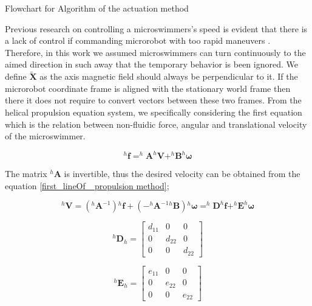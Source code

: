 \documentclass[12pt,a4paper,titlepage]{report}
\begin{document}
Flowchart for Algorithm of the actuation method


Previous research on controlling a microswimmers\rq{}s speed is evident that there is a lack
of control if commanding microrobot with too rapid maneuvers \citep{zhang2009characterizing} \citep{zhang2009artificial}
. Therefore, in this work we assumed
microswimmers can turn continuously to the aimed direction in such away that the temporary behavior is been
ignored. We define $\tilde{\bm{X}}$ as the axis magnetic field should always be perpendicular to it.
If the microrobot coordinate frame is aligned with the stationary world frame then there it does not require
to convert vectors between these two frames. From the helical propulsion equation system, 
we specifically considering the first equation which is the relation between non-fluidic force, angular and 
translational velocity of the microswimmer. 



\begin{equation}
^{h}\bm{f} = ^{h}\bm{A} ^{h}\bm{V} + ^{h}\bm{B} ^{h}\bm{\omega}
\label{first_lineOf_ propulsion method}
\end{equation}

The matrix $^{h}\bm{A}$ is invertible, thus the desired velocity can be obtained from the
 equation \ref{first_lineOf_ propulsion method};


\begin{equation}
^{h}\bm{V} = (^{h}\bm{A} ^{-1}){^{h}\bm{f}} + (-^{h}\bm{A} ^{-1} {^{h}\bm{B}}){^{h}\bm{\omega}} = 
^{h}\bm{D} ^{h}\bm{f} + ^{h}\bm{E} ^{h}\bm{\omega}
\label{first_lineOf_ propulsion method2}  
\end{equation}


\begin{equation}
 ^{h}\bm{D}_h = \begin{bmatrix}
       d_{11}  & 0 		 & 0           \\[0.3em]
       0		 & d_{22}           & 0\\[0.3em]
       0           	& 0 		& d_{22}
     \end{bmatrix}
\label{Dmatrix}
\end{equation}




\begin{equation}
 ^{h}\bm{E}_h = \begin{bmatrix}
       e_{11}  & 0 		 & 0           \\[0.3em]
       0		 & e_{22}           & 0\\[0.3em]
       0           	& 0 		& e_{22}
     \end{bmatrix}
\label{Ematrix}
\end{equation}
\end{document}
